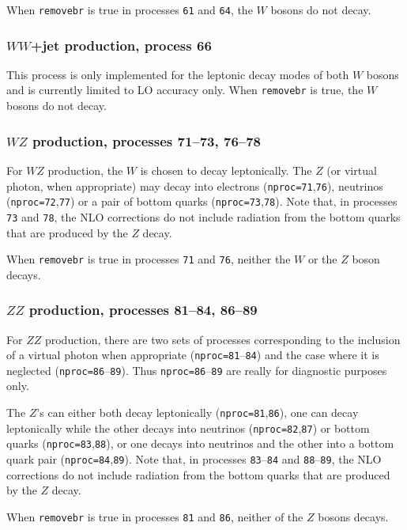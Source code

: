 \documentclass[12pt]{article}
\begin{document}
When {\tt removebr} is true in processes {\tt 61} and {\tt 64},
the $W$ bosons do not decay.

\subsubsection{$WW$+jet production, process 66}

This process is only implemented for the leptonic decay modes of both $W$
bosons and is currently limited to LO accuracy only. When {\tt removebr} is true,
the $W$ bosons do not decay.

\subsubsection{$WZ$ production, processes 71--73, 76--78}

For $WZ$ production, the $W$ is chosen to decay leptonically. The $Z$ (or
virtual photon, when appropriate) may decay into electrons
({\tt nproc=71},{\tt 76}), neutrinos ({\tt nproc=72},{\tt 77}) or a
pair of bottom quarks ({\tt nproc=73},{\tt 78}).
Note that, in processes
{\tt 73} and {\tt 78}, the NLO corrections do not include radiation from the
bottom quarks that are produced by the $Z$ decay.

When {\tt removebr} is true in processes {\tt 71} and {\tt 76},
neither the $W$ or the $Z$ boson decays.

\subsubsection{$ZZ$ production, processes 81--84, 86--89}

For $ZZ$ production, there are two sets of processes corresponding to the
inclusion of a virtual photon when appropriate ({\tt nproc=81}--{\tt 84})
and the case where it is neglected ({\tt nproc=86}--{\tt 89}).
Thus {\tt nproc=86}--{\tt 89} are really for diagnostic purposes only.

The $Z$'s can either both decay leptonically ({\tt nproc=81},{\tt 86}),
one can decay leptonically while the other decays into neutrinos
({\tt nproc=82},{\tt 87}) or bottom quarks ({\tt nproc=83},{\tt 88}), or
one decays into neutrinos and the other into a bottom quark pair
({\tt nproc=84},{\tt 89}). Note that, in processes
{\tt 83}--{\tt 84} and {\tt 88}--{\tt 89}, the NLO corrections do not include
radiation from the bottom quarks that are produced by the $Z$ decay.

When {\tt removebr} is true in processes {\tt 81} and {\tt 86},
neither of the $Z$ bosons decays.
\end{document}
